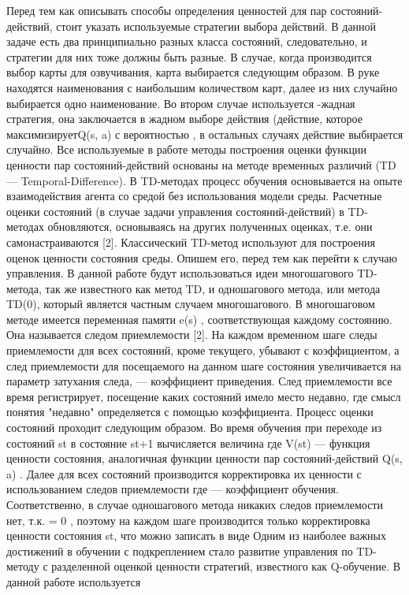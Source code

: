 \documentclass[12pt, a4paper]{report}
\theoremstyle{definition}
\theoremstyle{plain}
\theoremstyle{remark}
\theoremstyle{remark}
\theoremstyle{definition}
\begin{document}
Перед тем как описывать способы определения ценностей для пар состояний-действий, стоит указать используемые стратегии выбора действий. В данной задаче есть два принципиально разных класса состояний,
следовательно, и стратегии для них тоже должны быть разные. В случае, когда производится выбор карты для озвучивания, карта выбирается следующим образом. В руке находятся наименования с наибольшим количеством карт,
далее из них случайно выбирается одно наименование. Во втором случае используется -жадная стратегия, она заключается в жадном выборе действия (действие, которое максимизируетQ(s, a)  с вероятностью , в остальных случаях действие выбирается случайно. Все используемые в работе методы построения оценки функции ценности пар состояний-действий основаны на методе временных различий (TD — Temporal-Difference). В TD-методах процесс обучения основывается на опыте взаимодействия агента со средой без использования модели среды. Расчетные оценки состояний (в случае задачи управления состояний-действий) в TD-методах обновляются, основываясь на других полученных оценках, т.е. они самонастраиваются [2]. Классический TD-метод используют для построения оценок ценности состояния среды. Опишем его, перед тем как перейти к случаю управления. В данной работе будут использоваться идеи многошагового TD-метода, так же известного как метод TD, и одношагового метода, или метода TD(0), который является частным случаем многошагового. В многошаговом методе имеется переменная памяти e(s) , соответствующая каждому состоянию. Она называется следом приемлемости [2]. На каждом временном шаге следы приемлемости для всех состояний, кроме текущего, убывают с коэффициентом, а след приемлемости для посещаемого на данном шаге состояния увеличивается на параметр затухания следа,  — коэффициент приведения. След приемлемости все время регистрирует, посещение каких состояний имело место недавно, где смысл понятия "недавно" определяется с помощью коэффициента. Процесс оценки состояний проходит следующим образом. Во время обучения при переходе из состояний st в состояние st+1 вычисляется величина 
где V(st) — функция ценности состояния, аналогичная функции ценности пар состояний-действий Q(s, a) . Далее для всех состояний производится корректировка их ценности с использованием следов приемлемости где — коэффициент обучения. Соответственно, в случае одношагового метода никаких следов приемлемости нет, т.к.  = 0 , поэтому на каждом шаге производится только корректировка ценности состояния st, что можно записать в виде
Одним из наиболее важных достижений в обучении с подкреплением стало развитие управления по TD-методу с разделенной оценкой ценности стратегий, известного как Q-обучение. В данной работе используется 
\end{document}
